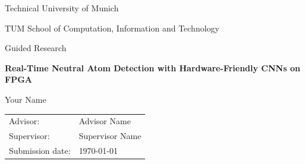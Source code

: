 \documentclass[11pt,a4paper,DIV=12,abstract=true]{scrartcl}
\newcommand{\thesistitle}{Real-Time Neutral Atom Detection with Hardware-Friendly CNNs on FPGA}
\newcommand{\thesisauthor}{Your Name}
\newcommand{\thesisadvisor}{Advisor Name}
\newcommand{\thesissupervisor}{Supervisor Name}
\begin{document}
\begin{titlepage}
\centering
{\Large Technical University of Munich\par}
{\large TUM School of Computation, Information and Technology\par}
\vspace{1cm}
{\large Guided Research\par}
\vspace{2.5cm}
{\LARGE\bfseries \thesistitle\par}
\vspace{2.5cm}
{\large \thesisauthor\par}
\vfill
\begin{tabular}{ll}
Advisor: & \thesisadvisor \\
Supervisor: & \thesissupervisor \\
Submission date: & \today
\end{tabular}
\end{titlepage}




\tableofcontents
\clearpage

\listoffigures
\clearpage

\listoftables
\clearpage


\clearpage



\newpage

\newpage

\newpage

\newpage

\newpage

\newpage

\newpage

\newpage

\newpage



\appendix







\end{document}

